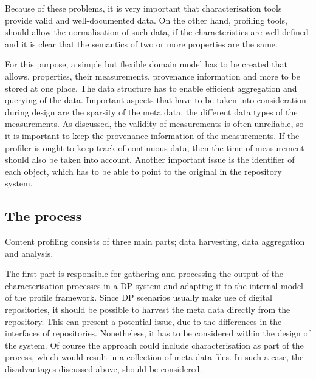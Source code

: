 Because of these problems, it is very important that characterisation tools provide valid and well-documented data. On the other hand, profiling tools, should allow the normalisation of such data, if the characteristics are well-defined and it is clear that the semantics of two or more properties are the same.

For this purpose, a simple but flexible domain model has to be created that allows, properties, their measurements, provenance information and more to be stored at one place. The data structure has to enable efficient aggregation and querying of the data. Important aspects that have to be taken into consideration during design are the sparsity of the meta data, the different data types of the measurements. As discussed, the validity of measurements is often unreliable, so it is important to keep the provenance information of the measurements. If the profiler is ought to keep track of continuous data, then the time of measurement should also be taken into account. Another important issue is the identifier of each object, which has to be able to point to the original in the repository system.


\subsection{The process}
Content profiling consists of three main parts; data harvesting, data aggregation and analysis.

The first part is responsible for gathering and processing the output of the characterisation processes in a DP system and adapting it to the internal model of the profile framework. Since DP scenarios usually make use of digital repositories, it should be possible to harvest the meta data directly from the repository. This can present a potential issue, due to the differences in the interfaces of repositories. Nonetheless, it has to be considered within the design of the system. Of course the approach could include characterisation as part of the process, which would result in a collection of meta data files. In such a case, the disadvantages discussed above, should be considered.

